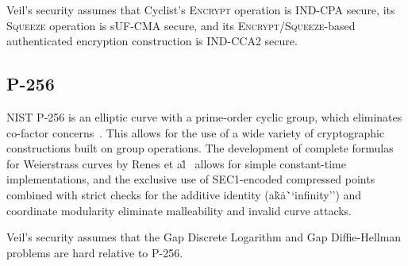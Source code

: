Veil's security assumes that Cyclist's \textsc{Encrypt} operation is IND-CPA secure, its
\textsc{Squeeze} operation is sUF-CMA secure, and its
\textsc{Encrypt}/\textsc{Squeeze}-based authenticated encryption construction is IND-CCA2 secure.

\subsection{P-256}\label{subsec:p256}

NIST P-256 is an elliptic curve with a prime-order cyclic group, which eliminates co-factor concerns~\cite{fips1864}.
This allows for the use of a wide variety of cryptographic constructions built on group operations.
The development of complete formulas for Weierstrass curves by Renes et al\.~\cite{renes2016} allows for simple
constant-time implementations, and the exclusive use of SEC1-encoded compressed points combined with strict checks
for the additive identity (a\.k\.a\. ``infinity'') and coordinate modularity eliminate malleability and invalid curve
attacks.

Veil's security assumes that the Gap Discrete Logarithm and Gap Diffie-Hellman problems are hard relative to P-256.
